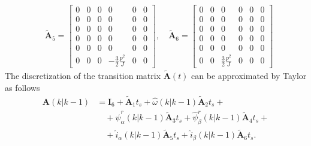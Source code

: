 \documentclass[11pt,a4paper]{scrartcl}
\numberwithin{equation}{section}
\theoremstyle{it}
\theoremstyle{definition}
\begin{document}
\begin{onehalfspace}
\begin{equation}
	\begin{aligned}
		&\tilde{\mathbf{A}}_5 = 
		\begin{bmatrix} 
			0 & 0 & 0 & 0 & 0 & 0 \\[6pt]			
			0 & 0 & 0 & 0 & 0 & 0 \\[6pt]
			0 & 0 & 0 & 0 & 0 & 0 \\[6pt]
			0 & 0 & 0 & 0 & 0 & 0 \\[6pt]
			0 & 0 & 0 & 0 & 0 & 0 \\[6pt]
			0 & 0 & 0 & -\frac{3}{2}\frac{p^2}{J} & 0 & 0
		\end{bmatrix},\quad
		\tilde{\mathbf{A}}_6 = 
		\begin{bmatrix} 
			0 & 0 & 0 & 0 & 0 & 0 \\[6pt]			
			0 & 0 & 0 & 0 & 0 & 0 \\[6pt]
			0 & 0 & 0 & 0 & 0 & 0 \\[6pt]
			0 & 0 & 0 & 0 & 0 & 0 \\[6pt]
			0 & 0 & 0 & 0 & 0 & 0 \\[6pt]
			0 & 0 & \frac{3}{2}\frac{p^2}{J} & 0 & 0 & 0
		\end{bmatrix} 
	\end{aligned}
\end{equation} 
The discretization of the transition matrix $\tilde{\mathbf{A}}(t)$ can be 
approximated by Taylor as follows
\begin{equation}\label{}
	\begin{aligned}
		{\mathbf{A}}(k|k-1) &= \mathbf{I}_6 + \tilde{\mathbf{A}}_1t_s + 
		\hat{\omega}(k|k-1) \tilde{\mathbf{A}}_2t_s +\\[8pt]
		&\quad + \hat{\psi}_\alpha^r(k|k-1) \tilde{\mathbf{A}}_3t_s  + \hat{\psi}_\beta^r(k|k-1) \tilde{\mathbf{A}}_4t_s +\\[8pt]
		&\quad + \hat{i}_\alpha(k|k-1) \tilde{\mathbf{A}}_5t_s + \hat{i}_\beta(k|k-1) \tilde{\mathbf{A}}_6t_s.
	\end{aligned}
\end{equation}

\end{onehalfspace}
\end{document}
